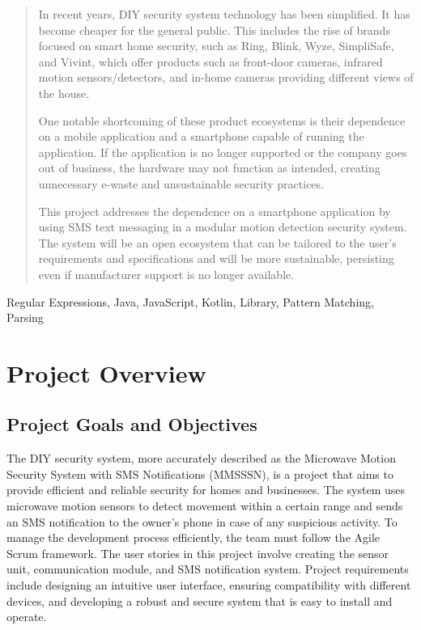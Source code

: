 \documentclass[conference]{IEEEtran}
\begin{document}
\begin{abstract}
    In recent years, DIY security system technology has been simplified. It has become cheaper for the general public.
    This includes the rise of brands focused on smart home security, such as Ring, Blink, Wyze, SimpliSafe, and Vivint,
    which offer products such as front-door cameras, infrared motion sensors/detectors, and in-home cameras
    providing different views of the house.

    One notable shortcoming of these product ecosystems is their dependence on a mobile application and a smartphone
    capable of running the application. If the application is no longer supported or the company goes out of business,
    the hardware may not function as intended, creating unnecessary e-waste and unsustainable security practices.

    This project addresses the dependence on a smartphone application by using SMS text messaging in a modular motion
    detection security system. The system will be an open ecosystem that can be tailored to the user's requirements and
    specifications and will be more sustainable, persisting even if manufacturer support is no longer available.

\end{abstract}

\begin{IEEEkeywords}
    Regular Expressions, Java, JavaScript, Kotlin, Library, Pattern Matching, Parsing
\end{IEEEkeywords}

\section{Project Overview}

\subsection{Project Goals and Objectives}
The DIY security system, more accurately described as the Microwave Motion Security System
with SMS Notifications (MMSSSN), is a project that aims to provide efficient and reliable
security for homes and businesses. The system uses microwave motion sensors to detect
movement within a certain range and sends an SMS notification to the owner's phone in
case of any suspicious activity. To manage the development process efficiently, the
team must follow the Agile Scrum framework. The user stories in this project involve
creating the sensor unit, communication module, and SMS notification system.
Project requirements include designing an intuitive user interface, ensuring
compatibility with different devices, and developing a robust and secure system that
is easy to install and operate.
\end{document}
